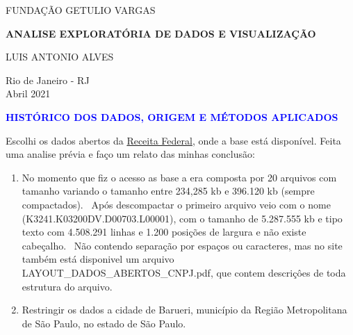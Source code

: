 \documentclass[
]{article}
\author{}
\date{\vspace{-2.5em}}
\begin{document}
\begin{center}

  {\LARGE FUNDAÇÃO GETULIO VARGAS}\\
  \vspace{7cm}

  {\large\textbf{{ANALISE EXPLORATÓRIA DE DADOS E VISUALIZAÇÃO}}}\\
  \vspace{2cm}

  {\large {LUIS ANTONIO ALVES}\\}

  \vspace{9,5cm}
  {\large {Rio de Janeiro - RJ}}\\
  \vspace{0.15cm}
  {\large {Abril 2021}}
\end{center}

\thispagestyle{empty}

\newpage

\begin{center}

  {\large\textcolor{blue}\textbf{{HISTÓRICO DOS DADOS, ORIGEM E MÉTODOS APLICADOS}}}\\
  \vspace{3cm} 

\end{center}

Escolhi os dados abertos da
\href{https://www.gov.br/receitafederal/pt-br/assuntos/orientacao-tributaria/cadastros/consultas/dados-publicos-cnpj}{Receita Federal},
onde a base está disponível. Feita uma analise prévia e faço um relato
das minhas conclusão: ~

\begin{enumerate}
\def\labelenumi{\arabic{enumi})}
\item
  No momento que fiz o acesso as base a era composta por 20 arquivos com
  tamanho variando o tamanho entre 234,285 kb e 396.120 kb (sempre
  compactados).~ Após descompactar o primeiro arquivo veio com o nome
  (K3241.K03200DV.D00703.L00001), com o tamanho de 5.287.555 kb e tipo
  texto com 4.508.291 linhas e 1.200 posições de largura e não existe
  cabeçalho.~ Não contendo separação por espaços ou caracteres, mas no
  site também está disponivel um arquivo
  LAYOUT\_DADOS\_ABERTOS\_CNPJ.pdf, que contem descriçôes de toda
  estrutura do arquivo. ~
\item
  Restringir os dados a cidade de Barueri, município da Região
  Metropolitana de São Paulo, no estado de São Paulo.
\end{enumerate}

\newpage
\end{document}
